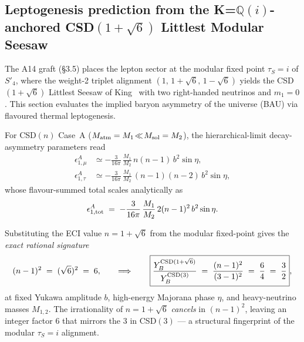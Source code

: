 
\subsection{Leptogenesis prediction from the K=$\mathbb{Q}(i)$-anchored CSD$(1+\sqrt{6})$ Littlest Modular Seesaw}
\label{sec:eci-lepto}

The A14 graft (\S 3.5) places the lepton sector at the modular fixed
point $\tau_S=i$ of $S'_4$, where the weight-2 triplet alignment
$(1,\,1+\sqrt 6,\,1-\sqrt 6)$ yields the CSD$(1+\sqrt 6)$ Littlest Seesaw
of King~\cite{King2022LMS,DKLL2019} with two right-handed neutrinos and
$m_1=0$.  This section evaluates the implied baryon asymmetry of the
universe (BAU) via flavoured thermal leptogenesis.

For CSD$(n)$ Case~A ($M_{\rm atm}=M_1\!\ll\! M_{\rm sol}=M_2$), the
hierarchical-limit decay-asymmetry parameters
\cite{KingMolinaSedgwickRowley2018,DavidsonNirSharma2008} read
\begin{align}
\epsilon^A_{1,\mu}  &\simeq -\frac{3}{16\pi}\,\frac{M_1}{M_2}\,n(n-1)\,b^2 \sin\eta,\\
\epsilon^A_{1,\tau} &\simeq -\frac{3}{16\pi}\,\frac{M_1}{M_2}\,(n-1)(n-2)\,b^2 \sin\eta,
\end{align}
whose flavour-summed total scales analytically as
\begin{equation}
  \epsilon^A_{1,{\rm tot}}
  \;=\;-\frac{3}{16\pi}\,\frac{M_1}{M_2}\,2(n-1)^2\,b^2\sin\eta.
  \label{eq:eps-tot}
\end{equation}

Substituting the ECI value $n = 1+\sqrt 6$ from the modular fixed-point
gives the \emph{exact rational signature}
\begin{equation}
  (n-1)^2 \;=\; (\sqrt 6)^2 \;=\; 6,
  \qquad\Longrightarrow\qquad
  \boxed{
    \frac{Y_B^{\rm CSD(1+\sqrt 6)}}{Y_B^{\rm CSD(3)}}
    \;=\;\frac{(n-1)^2}{(3-1)^2} \;=\; \frac{6}{4} \;=\; \frac{3}{2}
  },
  \label{eq:ratio}
\end{equation}
at fixed Yukawa amplitude $b$, high-energy Majorana phase $\eta$, and
heavy-neutrino masses $M_{1,2}$.  The irrationality of $n=1+\sqrt 6$
\emph{cancels} in $(n-1)^2$, leaving an integer factor $6$ that mirrors
the $3$ in CSD$(3)$ — a structural fingerprint of the modular
$\tau_S=i$ alignment.

